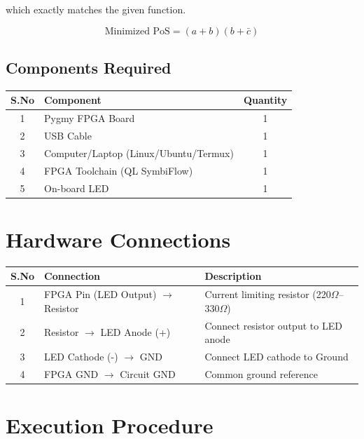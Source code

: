 \documentclass[12pt,a4paper]{article}
\begin{document}
which exactly matches the given function.

$$
\boxed{\text{Minimized PoS}=(a+b)(b+\bar{c})}
$$
\subsection*{Components Required}

\begin{center}
\begin{tabular}{|c|l|c|}
\hline
\textbf{S.No} & \textbf{Component} & \textbf{Quantity} \\
\hline
1 & Pygmy FPGA Board & 1 \\
\hline
2 & USB Cable & 1 \\
\hline
3 & Computer/Laptop (Linux/Ubuntu/Termux) & 1 \\
\hline
4 & FPGA Toolchain (QL SymbiFlow) & 1 \\
\hline
5 & On-board LED & 1 \\
\hline
\end{tabular}
\end{center}
\section*{Hardware Connections}

\begin{center}
\begin{tabular}{|c|l|l|}
\hline
\textbf{S.No} & \textbf{Connection} & \textbf{Description} \\
\hline
1 & FPGA Pin (LED Output) $\rightarrow$ Resistor & Current limiting resistor (220$\Omega$--330$\Omega$) \\
\hline
2 & Resistor $\rightarrow$ LED Anode (+) & Connect resistor output to LED anode \\
\hline
3 & LED Cathode (-) $\rightarrow$ GND & Connect LED cathode to Ground \\
\hline
4 & FPGA GND $\rightarrow$ Circuit GND & Common ground reference \\
\hline
\end{tabular}
\end{center}
\section*{Execution Procedure}
\end{document}
